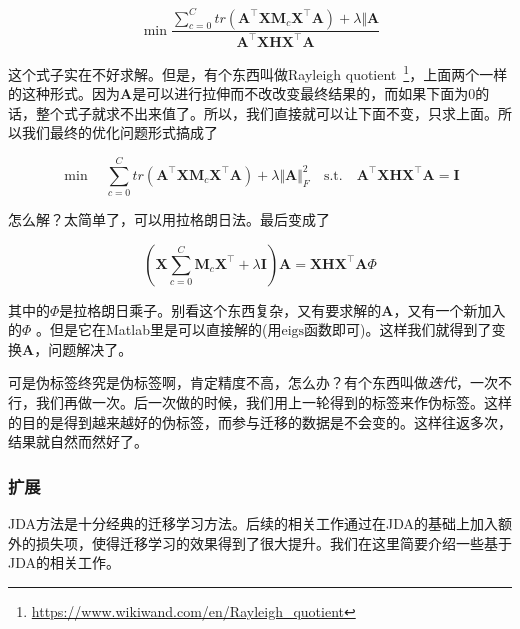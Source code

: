 \begin{equation}
	\min \frac{\sum_{c=0}^{C}tr(\mathbf{A}^\top \mathbf{X} \mathbf{M}_c \mathbf{X}^\top \mathbf{A}) + \lambda \Vert \mathbf{A}}{ \mathbf{A}^\top \mathbf{X} \mathbf{H} \mathbf{X}^\top \mathbf{A}}
\end{equation}

这个式子实在不好求解。但是，有个东西叫做Rayleigh quotient~\footnote{\url{https://www.wikiwand.com/en/Rayleigh_quotient}}，上面两个一样的这种形式。因为$\mathbf{A}$是可以进行拉伸而不改改变最终结果的，而如果下面为0的话，整个式子就求不出来值了。所以，我们直接就可以让下面不变，只求上面。所以我们最终的优化问题形式搞成了

\begin{equation}
	\min \quad \sum_{c=0}^{C}tr(\mathbf{A}^\top \mathbf{X} \mathbf{M}_c \mathbf{X}^\top \mathbf{A}) + \lambda \Vert \mathbf{A} \Vert ^2_F \quad \text{s.t.} \quad \mathbf{A}^\top \mathbf{X} \mathbf{H} \mathbf{X}^\top \mathbf{A} = \mathbf{I}
\end{equation}

怎么解？太简单了，可以用拉格朗日法。最后变成了

\begin{equation}
	\left(\mathbf{X} \sum_{c=0}^{C} \mathbf{M}_c \mathbf{X}^\top + \lambda \mathbf{I}\right) \mathbf{A} =\mathbf{X} \mathbf{H} \mathbf{X}^\top \mathbf{A} \Phi 
\end{equation}

其中的$\Phi$是拉格朗日乘子。别看这个东西复杂，又有要求解的$\mathbf{A}$，又有一个新加入的$\Phi$ 。但是它在Matlab里是可以直接解的(用$\mathrm{eigs}$函数即可)。这样我们就得到了变换$\mathbf{A}$，问题解决了。

可是伪标签终究是伪标签啊，肯定精度不高，怎么办？有个东西叫做\textit{迭代}，一次不行，我们再做一次。后一次做的时候，我们用上一轮得到的标签来作伪标签。这样的目的是得到越来越好的伪标签，而参与迁移的数据是不会变的。这样往返多次，结果就自然而然好了。

\subsubsection{扩展}

JDA方法是十分经典的迁移学习方法。后续的相关工作通过在JDA的基础上加入额外的损失项，使得迁移学习的效果得到了很大提升。我们在这里简要介绍一些基于JDA的相关工作。

